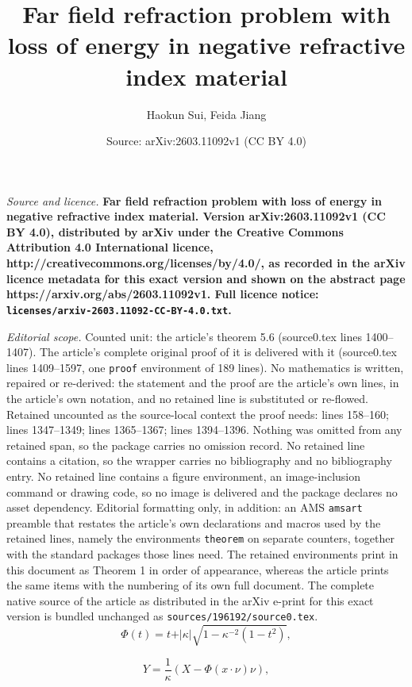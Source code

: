 \documentclass[10pt,a4paper]{amsart}
\title{\LARGE \bf Far field refraction problem with loss of energy in negative refractive index material}
\author{Haokun Sui, Feida Jiang}
\date{Source: arXiv:2603.11092v1 (CC BY 4.0)}
\begin{document}
\maketitle

\noindent\emph{Source and licence.} \LARGE \bf Far field refraction problem with loss of energy in negative refractive index material. Version arXiv:2603.11092v1 (CC BY 4.0), distributed by arXiv under the Creative Commons Attribution 4.0 International licence, http://creativecommons.org/licenses/by/4.0/, as recorded in the arXiv licence metadata for this exact version and shown on the abstract page https://arxiv.org/abs/2603.11092v1. Full licence notice: \texttt{licenses/arxiv-2603.11092-CC-BY-4.0.txt}.\par\smallskip

\noindent\textit{Editorial scope.} Counted unit: the article's theorem 5.6 (source0.tex lines 1400--1407). The article's complete original proof of it is delivered with it (source0.tex lines 1409--1597, one \texttt{proof} environment of 189 lines). No mathematics is written, repaired or re-derived: the statement and the proof are the article's own lines, in the article's own notation, and no retained line is substituted or re-flowed.  Retained uncounted as the source-local context the proof needs: lines 158--160; lines 1347--1349; lines 1365--1367; lines 1394--1396.  Nothing was omitted from any retained span, so the package carries no omission record.  No retained line contains a citation, so the wrapper carries no bibliography and no bibliography entry.  No retained line contains a figure environment, an image-inclusion command or drawing code, so no image is delivered and the package declares no asset dependency.  Editorial formatting only, in addition: an AMS \texttt{amsart} preamble that restates the article's own declarations and macros used by the retained lines, namely the environments \texttt{theorem} on separate counters, together with the standard packages those lines need.  The retained environments print in this document as Theorem 1 in order of appearance, whereas the article prints the same items with the numbering of its own full document.  The complete native source of the article as distributed in the arXiv e-print for this exact version is bundled unchanged as \texttt{sources/196192/source0.tex}.
\begin{equation}\label{2.5}
  \Phi(t) = t + \vert \kappa \vert \sqrt{1 - \kappa^{-2}(1 - t^{2})},
\end{equation}

\begin{equation}\label{5.1}
  Y = \frac{1}{\kappa}(X - \Phi(x \cdot \nu)\nu),
\end{equation}
\end{document}
